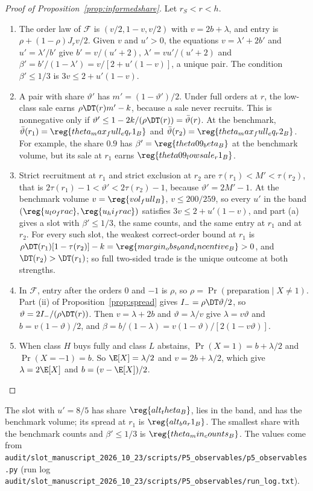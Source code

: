 \begin{proof}[Proof of Proposition~\ref{prop:informedshare}]
Let \(r_S<r<h\).
\begin{enumerate}[label=(\alph*),leftmargin=2em]
\item The order law of \(\mathcal F\) is \((v/2,1-v,v/2)\) with \(v=2b+\lambda\), and entry is \(\rho+(1-\rho)J_rv/2\).
Given \(v\) and \(u'>0\), the equations \(v=\lambda'+2b'\) and \(u'=\lambda'/b'\) give \(b'=v/(u'+2)\),
\(\lambda'=vu'/(u'+2)\) and \(\beta'=b'/(1-\lambda')=v/[2+u'(1-v)]\), a unique pair. The condition \(\beta'\le1/3\) is
\(3v\le2+u'(1-v)\).
\item A pair with share \(\vartheta'\) has \(m'=(1-\vartheta')/2\). Under full orders at \(r\), the low-class sale
earns \(\rho\DT(r)m'-k\), because a sale never recruits. This is nonnegative only if
\(\vartheta'\le1-2k/(\rho\DT(r))=\bar\vartheta(r)\). At the benchmark, \(\bar\vartheta(r_1)=\reg{theta_max_full_eq_r1_B}\) and
\(\bar\vartheta(r_2)=\reg{theta_max_full_eq_r2_B}\). For example, the share \(0.9\) has \(\beta'=\reg{theta09_beta_B}\)
at the benchmark volume, but its sale at \(r_1\) earns \(\reg{theta09_lowsale_r1_B}\).
\item Strict recruitment at \(r_1\) and strict exclusion at \(r_2\) are \(\tau(r_1)<M'<\tau(r_2)\), that is
\(2\tau(r_1)-1<\vartheta'<2\tau(r_2)-1\), because \(\vartheta'=2M'-1\). At the benchmark volume
\(v=\reg{vol_full_B}\), \(v\le200/259\), so every \(u'\) in the band \((\reg{u_lo_frac},\reg{u_hi_frac})\) satisfies
\(3v\le2+u'(1-v)\), and part (a) gives a slot with \(\beta'\le1/3\), the same counts, and the same entry at \(r_1\) and at
\(r_2\). For every such slot, the weakest correct-order bound at \(r_1\) is
\(\rho\DT(r_1)[1-\tau(r_2)]-k=\reg{margin_obs_band_incentive_B}>0\), and \(\DT(r_2)>\DT(r_1)\); so full two-sided trade is
the unique outcome at both strengths.
\item In \(\mathcal F\), entry after the orders \(0\) and \(-1\) is \(\rho\), so \(\rho=\Pr(\text{preparation}\mid X\ne1)\).
Part (ii) of Proposition~\ref{prop:spread} gives \(I_-=\rho\DT\vartheta/2\), so \(\vartheta=2I_-/(\rho\DT(r))\). Then
\(v=\lambda+2b\) and \(\vartheta=\lambda/v\) give \(\lambda=v\vartheta\) and \(b=v(1-\vartheta)/2\), and
\(\beta=b/(1-\lambda)=v(1-\vartheta)/[2(1-v\vartheta)]\).
\item When class \(H\) buys fully and class \(L\) abstains, \(\Pr(X=1)=b+\lambda/2\) and \(\Pr(X=-1)=b\). So
\(\E[X]=\lambda/2\) and \(v=2b+\lambda/2\), which give \(\lambda=2\E[X]\) and \(b=(v-\E[X])/2\).\qedhere
\end{enumerate}
\end{proof}
The slot with \(u'=8/5\) has share \(\reg{alt_theta_B}\), lies in the band, and has the benchmark volume; its spread at
\(r_1\) is \(\reg{alt_ba_r1_B}\). The smallest share with the benchmark counts and \(\beta'\le1/3\) is
\(\reg{theta_min_counts_B}\). The values come from
\nolinkurl{audit/slot_manuscript_2026_10_23/scripts/P5_observables/p5_observables.py} (run log
\nolinkurl{audit/slot_manuscript_2026_10_23/scripts/P5_observables/run_log.txt}).

